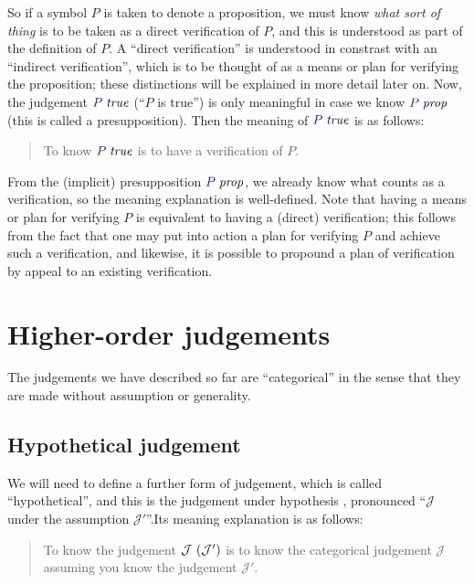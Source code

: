 \documentclass[main.tex]{subfiles}
\begin{document}
So if a symbol $P$ is taken to denote a proposition, we must know
\emph{what sort of thing} is to be taken as a direct verification of
$P$, and this is understood as part of the definition of $P$. A
``direct verification'' is understood in constrast with an ``indirect
verification'', which is to be thought of as a means or plan for
verifying the proposition; these distinctions will be explained in
more detail later on. Now, the judgement $\istrue{P}$ (``$P$ is
true'') is only meaningful in case we know $\isprop{P}$ (this is
called a presupposition). Then the meaning of $\istrue{P}$ is as
follows:

\begin{quote}
  To know $\istrue{P}$ is to have a verification of $P$.
\end{quote}

From the (implicit) presupposition $\isprop{P}$, we already know what
counts as a verification, so the meaning explanation is
well-defined. Note that having a means or plan for verifying $P$ is
equivalent to having a (direct) verification; this follows from the
fact that one may put into action a plan for verifying $P$ and achieve
such a verification, and likewise, it is possible to propound a plan
of verification by appeal to an existing verification.

\section{Higher-order judgements}

The judgements we have described so far are ``categorical'' in the sense that
they are made without assumption or generality.

\subsection{Hypothetical judgement}

We will need to define a further form of judgement, which is called
``hypothetical'', and this is the judgement under hypothesis
, pronounced
``$\mathcal{J}$ under the assumption $\mathcal{J}'$''.Its meaning
explanation is as follows:

\begin{quote}
  To know the judgement $\mathcal{J}\ (\mathcal{J}')$ is to know
  the categorical judgement $\mathcal{J}$ assuming you know the
  judgement $\mathcal{J}'$.
\end{quote}
\end{document}
